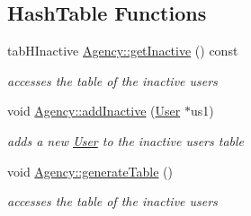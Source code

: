 \subsection*{Hash\+Table Functions}
\begin{DoxyCompactItemize}
\item 
tab\+H\+Inactive \hyperlink{group___agency_ga6e06b2cf396c6d41ed4d5e2f215a3035}{Agency\+::get\+Inactive} () const
\begin{DoxyCompactList}\small\item\em accesses the table of the inactive users \end{DoxyCompactList}\item 
void \hyperlink{group___agency_gaca43b6ff4d5b43aae73779cf271ac0fe}{Agency\+::add\+Inactive} (\hyperlink{class_user}{User} $\ast$us1)
\begin{DoxyCompactList}\small\item\em adds a new \hyperlink{class_user}{User} to the inactive users table \end{DoxyCompactList}\item 
\mbox{\label{group___agency_ga4ef49242ff8030eddb766972f7555437}} 
void \hyperlink{group___agency_ga4ef49242ff8030eddb766972f7555437}{Agency\+::generate\+Table} ()
\begin{DoxyCompactList}\small\item\em accesses the table of the inactive users \end{DoxyCompactList}\end{DoxyCompactItemize}
